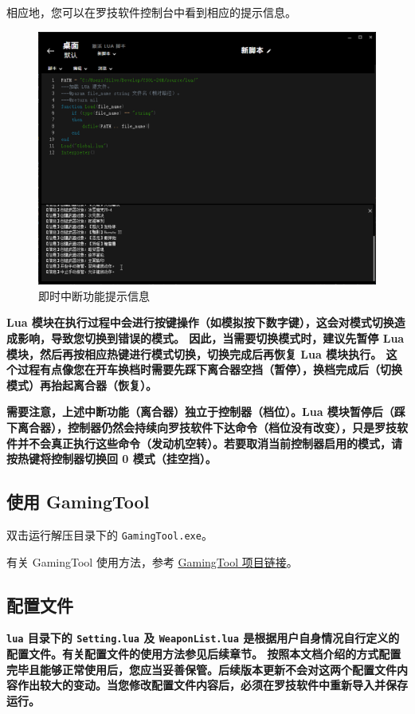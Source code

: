相应地，您可以在罗技软件控制台中看到相应的提示信息。

\begin{figure}[H]
    \Centering
    \includegraphics[width=\textwidth]{docs/assets/intro/interrupt.png}
    \caption{即时中断功能提示信息}
\end{figure}

\textbf{\color{red}Lua 模块在执行过程中会进行按键操作（如模拟按下数字键），这会对模式切换造成影响，导致您切换到错误的模式。
因此，当需要切换模式时，建议先暂停 Lua 模块，然后再按相应热键进行模式切换，切换完成后再恢复 Lua 模块执行。
这个过程有点像您在开车换档时需要先踩下离合器空挡（暂停），换档完成后（切换模式）再抬起离合器（恢复）。}

\textbf{\color{red}需要注意，上述中断功能（离合器）独立于控制器（档位）。Lua 模块暂停后（踩下离合器），控制器仍然会持续向罗技软件下达命令（档位没有改变），只是罗技软件并不会真正执行这些命令（发动机空转）。若要取消当前控制器启用的模式，请按热键将控制器切换回 0 模式（挂空挡）。}

\subsection{使用 GamingTool}

双击运行解压目录下的 \lstinline{GamingTool.exe}。

有关 GamingTool 使用方法，参考 \href{https://gitee.com/silver1867/gaming-tool}{GamingTool 项目链接}。

\subsection{配置文件}

\textbf{\color{red}\lstinline{lua} 目录下的 \lstinline{Setting.lua} 及 \lstinline{WeaponList.lua} 是根据用户自身情况自行定义的配置文件。有关配置文件的使用方法参见后续章节。
按照本文档介绍的方式配置完毕且能够正常使用后，您应当妥善保管。后续版本更新不会对这两个配置文件内容作出较大的变动。当您修改配置文件内容后，必须在罗技软件中重新导入并保存运行。}
